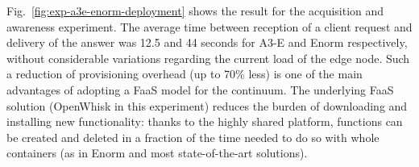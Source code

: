 Fig.~\ref{fig:exp-a3e-enorm-deployment} shows the result for the acquisition and awareness experiment. The average time between reception of a client request and delivery of the answer was 12.5 and 44 seconds for A3-E and Enorm respectively, without considerable variations regarding the current load of the edge node. Such a reduction of provisioning overhead (up to 70\% less) is one of the main advantages of adopting a FaaS model for the continuum. The underlying FaaS solution (OpenWhisk in this experiment) reduces the burden of downloading and installing new functionality: thanks to the highly shared platform, functions can be created and deleted in a fraction of the time needed to do so with whole containers (as in Enorm and most state-of-the-art solutions). 

